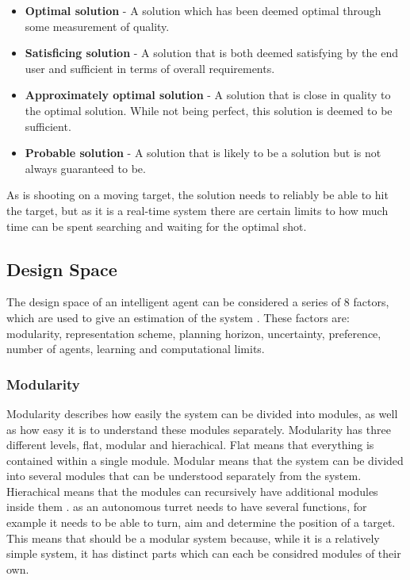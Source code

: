 \begin{itemize}
  \item \textbf{Optimal solution} - A solution which has been deemed optimal
  through some measurement of quality.
  \item \textbf{Satisficing solution} - A solution that is both deemed
  satisfying by the end user and sufficient in terms of overall requirements. 
  \item \textbf{Approximately optimal solution} - A solution that is close in
  quality to the optimal solution. While not being perfect, this solution is
  deemed to be sufficient.
  \item \textbf{Probable solution} - A solution that is likely to be a solution
  but is not always guaranteed to be.
\end{itemize}

As \name is shooting on a moving target, the solution needs to reliably be able
to hit the target, but as it is a real-time system there are certain limits to
how much time can be spent searching and waiting for the optimal shot.

\subsection{Design Space}
The design space of an intelligent agent can be considered a series of 8
factors, which are used to give an estimation of the system \citep[Ch.
1.5]{MIBook}. These factors are: modularity, representation scheme, planning
horizon, uncertainty, preference, number of agents, learning and computational
limits.

\subsubsection{Modularity}
Modularity describes how easily the system can be divided into modules, as well
as how easy it is to understand these modules separately. Modularity has three
different levels, flat, modular and hierachical. Flat means that everything is
contained within a single module. Modular means that the system can be divided
into several modules that can be understood separately from the system.
Hierachical means that the modules can recursively have additional modules
inside them \citep[Ch 1.5.1]{MIBook}. \name as an autonomous turret needs to
have several functions, for example it needs to be able to turn, aim and determine the position of a target.
This means that \name should be a modular system because, while it is a
relatively simple system, it has distinct parts which can each be considred
modules of their own.

